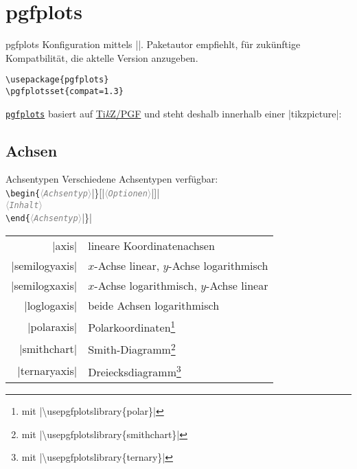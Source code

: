 \documentclass{beamer}
\newcommand{\meta}[1]{\textcolor{gray}{$\langle$\texttt{\textsl{#1}}$\rangle$}}
\newcommand{\pkg}[1]{\href{http://ctan.org/pkg/#1}{\alert{\texttt{#1}}}}
\newcommand{\TikZ}{Ti\textit{k}Z}
\begin{document}
\section{pgfplots}
\begin{frame}[fragile]{pgfplots}
Konfiguration mittels |\pgfplotsset{|\meta{Optionen}|}|. Paketautor empfiehlt, für zukünftige Kompatbilität, die aktelle Version anzugeben.
\begin{lstlisting}
\usepackage{pgfplots}
\pgfplotsset{compat=1.3}
\end{lstlisting}
\pause
\pkg{pgfplots} basiert auf \href{http://ctan.org/pkg/pgf}{\TikZ/PGF} und steht deshalb innerhalb einer |tikzpicture|:
\begingroup
\pgfplotsset{scale=0.5}
\begin{LTXexample}[pos=r, explpreset={}, preset=, rframe={}]
\end{LTXexample}
\endgroup
\end{frame}


\subsection{Achsen}
\begin{frame}{Achsentypen}
Verschiedene Achsentypen verfügbar: \\[1em]
\texttt{\textbackslash begin\{}\meta{Achsentyp}|\}[|\meta{Optionen}|]|\\
\quad\meta{Inhalt}\\
\texttt{\textbackslash end\{}\meta{Achsentyp}|\}|

\vfill

\begin{tabular}{rl}
|axis| & lineare Koordinatenachsen\\
|semilogyaxis| & $x$-Achse linear, $y$-Achse logarithmisch\\
|semilogxaxis| & $x$-Achse logarithmisch, $y$-Achse linear\\
|loglogaxis| & beide Achsen logarithmisch\\
|polaraxis| & Polarkoordinaten\footnote{mit |\textbackslash usepgfplotslibrary\{polar\}|}\\
|smithchart| & Smith-Diagramm\footnote{mit |\textbackslash usepgfplotslibrary\{smithchart\}|}\\
|ternaryaxis| & Dreiecksdiagramm\footnote{mit |\textbackslash usepgfplotslibrary\{ternary\}|}
\end{tabular}
\end{frame}
\end{document}
